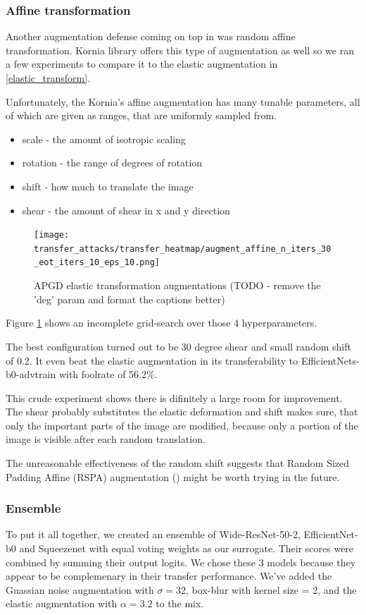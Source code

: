 \subsubsection{Affine transformation}
Another augmentation defense coming on top in \cite{qiu2020fencebox} was random affine transformation. Kornia library offers this type of augmentation as well so we ran a few experiments to compare it to the elastic augmentation in \ref{elastic_transform}. 

Unfortunately, the Kornia's affine augmentation has many tunable parameters, all of which are given as ranges, that are uniformly sampled from.
\begin{itemize}
    \item scale - the amount of isotropic scaling
    \item rotation - the range of degrees of rotation
    \item shift - how much to translate the image 
    \item shear - the amount of shear in x and y direction
\end{itemize}


\begin{figure}
    \centering
    \texttt{[image: transfer\_attacks/transfer\_heatmap/augment\_affine\_n\_iters\_30\_eot\_iters\_10\_eps\_10.png]}
    \caption{APGD elastic transformation augmentations (TODO - remove the 'deg' param and format the captions better)}
    \label{fig:apgd_affine}
\end{figure}


Figure \ref{fig:apgd_affine} shows an incomplete grid-search over those 4 hyperparameters.

The best configuration turned out to be 30 degree shear and small random shift of 0.2. It even beat the elastic augmentation in its transferability to EfficientNets-b0-advtrain with foolrate of 56.2\%.

This crude experiment shows there is difinitely a large room for improvement. The shear probably substitutes the elastic deformation and shift makes sure, that only the important parts of the image are modified, because only a portion of the image is visible after each random translation.

The unreasonable effectiveness of the random shift suggests that Random Sized Padding Affine (RSPA) augmentation (\cite{qiu2020fencebox}) might be worth trying in the future.

\subsubsection{Ensemble}
To put it all together, we created an ensemble of Wide-ResNet-50-2, EfficientNet-b0 and Squeezenet with equal voting weights as our surrogate. Their scores were combined by summing their output logits. We chose these 3 models because they appear to be complemenary in their transfer performance. We've added the Guassian noise augmentation with $\sigma = 32$, box-blur with kernel size = 2, and the elastic augmentation with $\alpha = 3.2$ to the mix.

